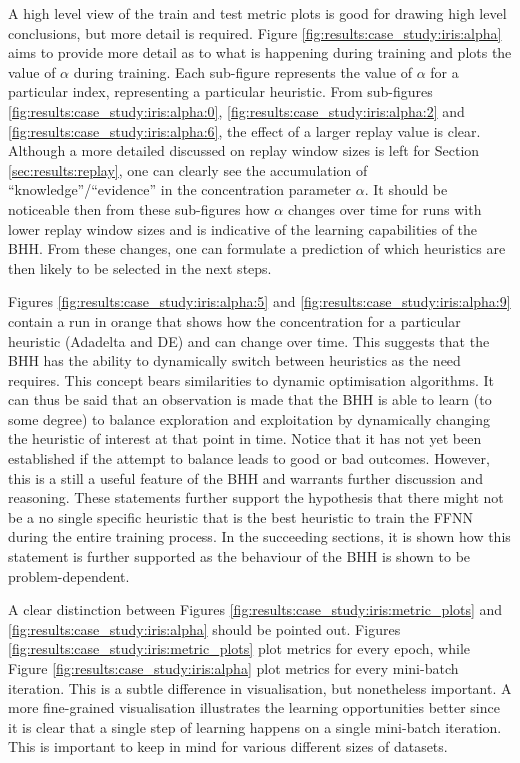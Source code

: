 A high level view of the train and test metric plots is good for drawing high level conclusions, but more detail is required. Figure \ref{fig:results:case_study:iris:alpha} aims to provide more detail as to what is happening during training and plots the value of $\alpha$ during training. Each sub-figure represents the value of $\alpha$ for a particular index, representing a particular heuristic. From sub-figures \ref{fig:results:case_study:iris:alpha:0}, \ref{fig:results:case_study:iris:alpha:2} and \ref{fig:results:case_study:iris:alpha:6}, the effect of a larger replay value is clear. Although a more detailed discussed on replay window sizes is left for Section \ref{sec:results:replay}, one can clearly see the accumulation of ``knowledge''/``evidence'' in the concentration parameter $\alpha$. It should be noticeable then from these sub-figures how $\alpha$ changes over time for runs with lower replay window sizes and is indicative of the learning capabilities of the \Ac{BHH}.  From these changes, one can formulate a prediction of which heuristics are then likely to be selected in the next steps.

Figures \ref{fig:results:case_study:iris:alpha:5} and \ref{fig:results:case_study:iris:alpha:9} contain a run in orange that shows how the concentration for a particular heuristic (\Acs{Adadelta} and \Acs{DE}) and can change over time. This suggests that the \Acs{BHH} has the ability to dynamically switch between heuristics as the need requires. This concept bears similarities to dynamic optimisation algorithms. It can thus be said that an observation is made that the \Acs{BHH} is able to learn (to some degree) to balance exploration and exploitation by dynamically changing the heuristic of interest at that point in time. Notice that it has not yet been established if the attempt to balance leads to good or bad outcomes. However, this is a still a useful feature of the \Acs{BHH} and warrants further discussion and reasoning. These statements further support the hypothesis that there might not be a no single specific heuristic that is the best heuristic to train the \Acs{FFNN} during the entire training process. In the succeeding sections, it is shown how this statement is further supported as the behaviour of the \Acs{BHH} is shown to be problem-dependent.

A clear distinction between Figures \ref{fig:results:case_study:iris:metric_plots} and \ref{fig:results:case_study:iris:alpha} should be pointed out. Figures \ref{fig:results:case_study:iris:metric_plots} plot metrics for every epoch, while Figure \ref{fig:results:case_study:iris:alpha} plot metrics for every mini-batch iteration. This is a subtle difference in visualisation, but nonetheless important. A more fine-grained visualisation illustrates the learning opportunities better since it is clear that a single step of learning happens on a single mini-batch iteration. This is important to keep in mind for various different sizes of datasets.


